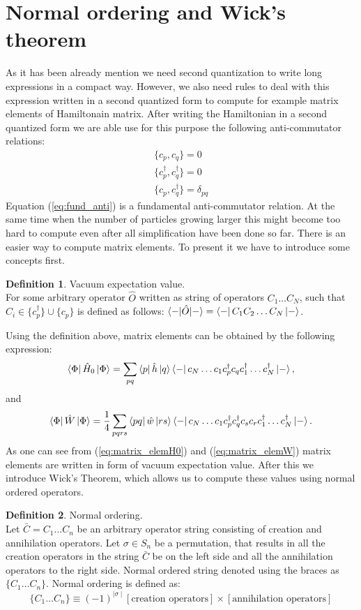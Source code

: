 \documentclass[twoside,english]{uiofysmaster}
\theoremstyle{definition}
\newtheorem{defn}{Definition}
\begin{document}
\section{Normal ordering and Wick's theorem} \label{sec:Wick}
As it has been already mention we need second quantization to write long expressions in a compact way. However, we also need rules to deal with this expression written in a second quantized form to compute for example matrix elements of Hamiltonain matrix. After writing the Hamiltonian in a second quantized form we are able use for this purpose the following anti-commutator relations:
\begin{gather}
\{c_p,c_q \}=0\\
\{c_p^\dagger,c_q^\dagger \}=0\\
\{c_p,c_q^\dagger\} = \delta_{pq} \label{eq:fund_anti}
\end{gather}
Equation (\ref{eq:fund_anti})  is a fundamental anti-commutator relation. At the same time when the number of particles growing larger this might become too hard to compute even after all simplification have been done so far. There is an easier way to compute matrix elements. To present it we have to introduce some concepts first.
\begin{defn} Vacuum expectation value. \\
	For some arbitrary operator $\hat{O}$ written as string of operators $C_1 \dots C_N$, such that $C_i \in \{c_p^\dagger\} \cup \{c_p\} $ is defined as follows: $ \braket{-|\hat{O}|-}=\bra{-}C_1C_2 \dots C_N \ket{-}$.
\end{defn}
Using the definition above, matrix elements can be obtained by the following expression:
\begin{equation} \label{eq:matrix_elemH0}
\bra{\Phi}\hat{H}_0\ket{\Phi}=\sum_{pq}\bra{p}\hat{h}\ket{q}\bra{-}c_N \dots c_1 c_p^\dagger c_q c_1^\dagger \dots c_N^\dagger \ket{-},
\end{equation}
and
\begin{equation} \label{eq:matrix_elemW}
\bra{\Phi}\hat{W}\ket{\Phi}= \frac{1}{4}\sum_{pqrs} \bra{pq}\hat{w}\ket{rs} \bra{-}c_N \dots c_1 c_p^\dagger c_q^\dagger c_s c_r c_1^\dagger \dots c_N^\dagger \ket{-}. 
\end{equation} 
As one can see from (\ref{eq:matrix_elemH0}) and (\ref{eq:matrix_elemW}) matrix elements are written in form of vacuum expectation value. After this we introduce Wick's Theorem, which allows us to compute these values using normal ordered operators. 
\begin{defn} Normal ordering.\\
	Let $\bar{C}=C_1 \dots C_n$ be an arbitrary operator string consisting of creation and annihilation operators. 
	Let $\sigma \in S_n$ be a permutation, that results in all the creation operators in the string $\bar{C}$ be on the left side and all the annihilation operators to the right side. Normal ordered string denoted using the braces as $\{C_1 \dots C_n \}$. Normal ordering is defined as:
\begin{equation}
	\{C_1 \dots C_n \} \equiv (-1)^{\mid \sigma \mid}[\text{creation operators} ] \times [ \text{annihilation operators}]
\end{equation}
\end{defn}
\end{document}
